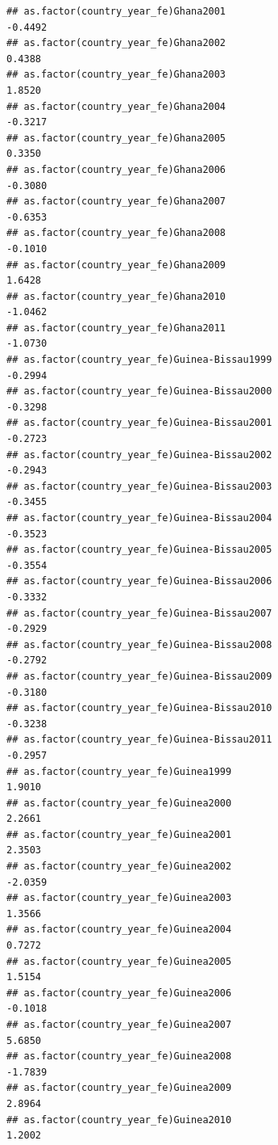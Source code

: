 \documentclass[
  a4paper,
]{article}
\begin{document}
\begin{verbatim}
## as.factor(country_year_fe)Ghana2001                            -0.4492
## as.factor(country_year_fe)Ghana2002                             0.4388
## as.factor(country_year_fe)Ghana2003                             1.8520
## as.factor(country_year_fe)Ghana2004                            -0.3217
## as.factor(country_year_fe)Ghana2005                             0.3350
## as.factor(country_year_fe)Ghana2006                            -0.3080
## as.factor(country_year_fe)Ghana2007                            -0.6353
## as.factor(country_year_fe)Ghana2008                            -0.1010
## as.factor(country_year_fe)Ghana2009                             1.6428
## as.factor(country_year_fe)Ghana2010                            -1.0462
## as.factor(country_year_fe)Ghana2011                            -1.0730
## as.factor(country_year_fe)Guinea-Bissau1999                    -0.2994
## as.factor(country_year_fe)Guinea-Bissau2000                    -0.3298
## as.factor(country_year_fe)Guinea-Bissau2001                    -0.2723
## as.factor(country_year_fe)Guinea-Bissau2002                    -0.2943
## as.factor(country_year_fe)Guinea-Bissau2003                    -0.3455
## as.factor(country_year_fe)Guinea-Bissau2004                    -0.3523
## as.factor(country_year_fe)Guinea-Bissau2005                    -0.3554
## as.factor(country_year_fe)Guinea-Bissau2006                    -0.3332
## as.factor(country_year_fe)Guinea-Bissau2007                    -0.2929
## as.factor(country_year_fe)Guinea-Bissau2008                    -0.2792
## as.factor(country_year_fe)Guinea-Bissau2009                    -0.3180
## as.factor(country_year_fe)Guinea-Bissau2010                    -0.3238
## as.factor(country_year_fe)Guinea-Bissau2011                    -0.2957
## as.factor(country_year_fe)Guinea1999                            1.9010
## as.factor(country_year_fe)Guinea2000                            2.2661
## as.factor(country_year_fe)Guinea2001                            2.3503
## as.factor(country_year_fe)Guinea2002                           -2.0359
## as.factor(country_year_fe)Guinea2003                            1.3566
## as.factor(country_year_fe)Guinea2004                            0.7272
## as.factor(country_year_fe)Guinea2005                            1.5154
## as.factor(country_year_fe)Guinea2006                           -0.1018
## as.factor(country_year_fe)Guinea2007                            5.6850
## as.factor(country_year_fe)Guinea2008                           -1.7839
## as.factor(country_year_fe)Guinea2009                            2.8964
## as.factor(country_year_fe)Guinea2010                            1.2002

\end{verbatim}
\end{document}
